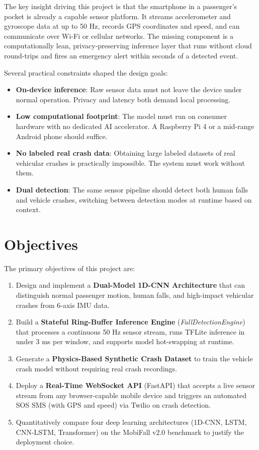 The key insight driving this project is that the smartphone in a passenger's pocket is already a capable sensor platform. It streams accelerometer and gyroscope data at up to 50 Hz, records GPS coordinates and speed, and can communicate over Wi-Fi or cellular networks. The missing component is a computationally lean, privacy-preserving inference layer that runs without cloud round-trips and fires an emergency alert within seconds of a detected event.

Several practical constraints shaped the design goals:
\begin{itemize}
    \item \textbf{On-device inference}: Raw sensor data must not leave the device under normal operation. Privacy and latency both demand local processing.
    \item \textbf{Low computational footprint}: The model must run on consumer hardware with no dedicated AI accelerator. A Raspberry Pi 4 or a mid-range Android phone should suffice.
    \item \textbf{No labeled real crash data}: Obtaining large labeled datasets of real vehicular crashes is practically impossible. The system must work without them.
    \item \textbf{Dual detection}: The same sensor pipeline should detect both human falls and vehicle crashes, switching between detection modes at runtime based on context.
\end{itemize}

\section{Objectives}
\label{sec:objectives}

The primary objectives of this project are:

\begin{enumerate}
    \item Design and implement a \textbf{Dual-Model 1D-CNN Architecture} that can distinguish normal passenger motion, human falls, and high-impact vehicular crashes from 6-axis IMU data.
    \item Build a \textbf{Stateful Ring-Buffer Inference Engine} (\textit{FallDetectionEngine}) that processes a continuous 50 Hz sensor stream, runs TFLite inference in under 3 ms per window, and supports model hot-swapping at runtime.
    \item Generate a \textbf{Physics-Based Synthetic Crash Dataset} to train the vehicle crash model without requiring real crash recordings.
    \item Deploy a \textbf{Real-Time WebSocket API} (FastAPI) that accepts a live sensor stream from any browser-capable mobile device and triggers an automated SOS SMS (with GPS and speed) via Twilio on crash detection.
    \item Quantitatively compare four deep learning architectures (1D-CNN, LSTM, CNN-LSTM, Transformer) on the MobiFall v2.0 benchmark to justify the deployment choice.
\end{enumerate}

